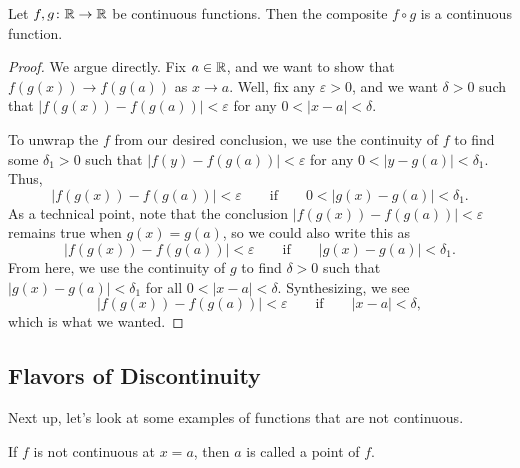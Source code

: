 \documentclass[../notes.tex]{subfiles}
\begin{document}
\begin{proposition}
    Let $f,g\colon\mathbb R\to \mathbb R$ be continuous functions. Then the composite $f\circ g$ is a continuous function. 
\end{proposition}
\begin{proof}
    We argue directly. Fix $a\in \mathbb R$, and we want to show that $f(g(x))\to f(g(a))$ as $x\to a$. Well, fix any $\varepsilon>0$, and we want $\delta>0$ such that $\left|f(g(x))-f(g(a))\right|<\varepsilon$ for any $0<|x-a|<\delta$.
    
    To unwrap the $f$ from our desired conclusion, we use the continuity of $f$ to find some $\delta_1>0$ such that $|f(y)-f(g(a))|<\varepsilon$ for any $0<|y-g(a)|<\delta_1$. Thus,
    \[\left|f(g(x))-f(g(a))\right|<\varepsilon\qquad\text{if}\qquad0<\left|g(x)-g(a)\right|<\delta_1.\]
    As a technical point, note that the conclusion $\left|f(g(x))-f(g(a))\right|<\varepsilon$ remains true when $g(x)=g(a)$, so we could also write this as
    \[\left|f(g(x))-f(g(a))\right|<\varepsilon\qquad\text{if}\qquad\left|g(x)-g(a)\right|<\delta_1.\]
    From here, we use the continuity of $g$ to find $\delta>0$ such that $\left|g(x)-g(a)\right|<\delta_1$ for all $0<|x-a|<\delta$. Synthesizing, we see
    \[\left|f(g(x))-f(g(a))\right|<\varepsilon\qquad\text{if}\qquad\left|x-a\right|<\delta,\]
    which is what we wanted.
\end{proof}




\subsection{Flavors of Discontinuity}
Next up, let's look at some examples of functions that are not continuous. 

\begin{definition}[discontinuity]
    If $f$ is not continuous at $x=a$, then $a$ is called a  point of $f$. 
\end{definition}
\end{document}
